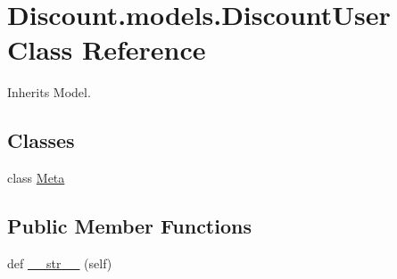 \hypertarget{class_discount_1_1models_1_1_discount_user}{}\section{Discount.\+models.\+Discount\+User Class Reference}
\label{class_discount_1_1models_1_1_discount_user}


Inherits Model.

\subsection*{Classes}
\begin{DoxyCompactItemize}
\item 
class \hyperlink{class_discount_1_1models_1_1_discount_user_1_1_meta}{Meta}
\end{DoxyCompactItemize}
\subsection*{Public Member Functions}
\begin{DoxyCompactItemize}
\item 
def \hyperlink{class_discount_1_1models_1_1_discount_user_a9dc158c8d924067598f48cae3c9016c0}{\+\_\+\+\_\+str\+\_\+\+\_\+} (self)
\end{DoxyCompactItemize}
